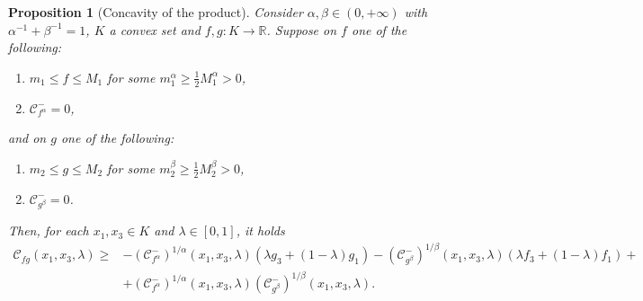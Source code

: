 \documentclass[11pt, reqno]{amsart}
\newtheorem{proposition}[lemma]{Proposition}
\theoremstyle{definition}
\numberwithin{equation}{section}
\newcommand{\R}{\mathbb{R}}
\begin{document}
 \begin{proposition}[Concavity of the product] \label{concavità prodotto}
Consider $\alpha,\beta \in (0,+\infty)$ with $\alpha^{-1}+\beta^{-1}=1$, $K$ a convex set and $f,g\colon K \to \R$. 
Suppose on $f$ one of the following:
\begin{enumerate}[label=\textit{\roman*})]
	\item $m_1\leq f\leq M_1$ for some $m_1^{\alpha}\geq \frac{1}{2} M_1^{\alpha}>0$,
	\item $\mathcal{C}^-_{f^{\alpha}}=0$, 
\end{enumerate}
and on $g$ one of the following:
\begin{enumerate}[label=\textit{\roman*})]
	\item $m_2\leq g\leq M_2$ for some $m_2^{\beta}\geq \frac{1}{2} M_2^{\beta}>0$,
	\item $\mathcal{C}^-_{g^{\beta}}=0$. 
	\end{enumerate}
 Then, for each $x_1,x_3 \in K$ and $\lambda \in [0,1]$, it holds
\begin{align*}
	\mathcal{C}_{fg}(x_1,x_3,\lambda)\geq&
	 -(\mathcal{C}^-_{f^{\alpha}})^{1/\alpha}(x_1,x_3,\lambda) (\lambda g_3+(1-\lambda) g_1)-(\mathcal{C}^-_{g^{\beta}})^{1/\beta}(x_1,x_3,\lambda) (\lambda f_3+(1-\lambda) f_1)+\\&+(\mathcal{C}^-_{f^{\alpha}})^{1/\alpha}(x_1,x_3,\lambda)(\mathcal{C}^-_{g^{\beta}})^{1/\beta}(x_1,x_3,\lambda).
\end{align*}
 \end{proposition}
 
\end{document}
